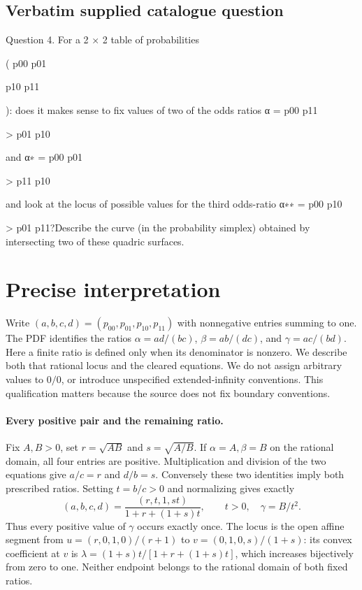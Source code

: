 \documentclass[11pt]{article}
\begin{document}
\subsection{Verbatim supplied catalogue question}
Question 4. For a 2 × 2 table of probabilities

( p00 p01

p10 p11

): does it makes sense to fix values of two of the odds ratios α = p00 p11

> p01 p10

and α∗ = p00 p01

> p11 p10

and look at the locus of possible values for the third odds-ratio α∗∗ = p00 p10

> p01 p11?Describe the curve (in the probability simplex) obtained by intersecting two of these quadric surfaces.

\section{Precise interpretation}
Write $(a,b,c,d)=(p_{00},p_{01},p_{10},p_{11})$ with nonnegative entries
summing to one. The PDF identifies the ratios
$\alpha=ad/(bc)$, $\beta=ab/(dc)$, and $\gamma=ac/(bd)$.
Here a finite ratio is defined only when its denominator is nonzero.
We describe both that rational locus and the cleared equations. We do not
assign arbitrary values to $0/0$, or introduce unspecified extended-infinity
conventions. This qualification matters because the source does not fix
boundary conventions.

\paragraph{Every positive pair and the remaining ratio.}
Fix $A,B>0$, set $r=\sqrt{AB}$ and $s=\sqrt{A/B}$. If
$\alpha=A,\beta=B$ on the rational domain, all four entries are positive.
Multiplication and division of the two equations give $a/c=r$ and $d/b=s$.
Conversely these two identities imply both prescribed ratios. Setting
$t=b/c>0$ and normalizing gives exactly
\[
(a,b,c,d)=\frac{(r,t,1,st)}{1+r+(1+s)t},\qquad t>0,
\quad\gamma=B/t^2.
\]
Thus every positive value of $\gamma$ occurs exactly once. The locus is
the open affine segment from $u=(r,0,1,0)/(r+1)$ to
$v=(0,1,0,s)/(1+s)$: its convex coefficient at $v$ is
$\lambda=(1+s)t/[1+r+(1+s)t]$, which increases bijectively from zero to
one. Neither endpoint belongs to the rational domain of both fixed ratios.
\end{document}
